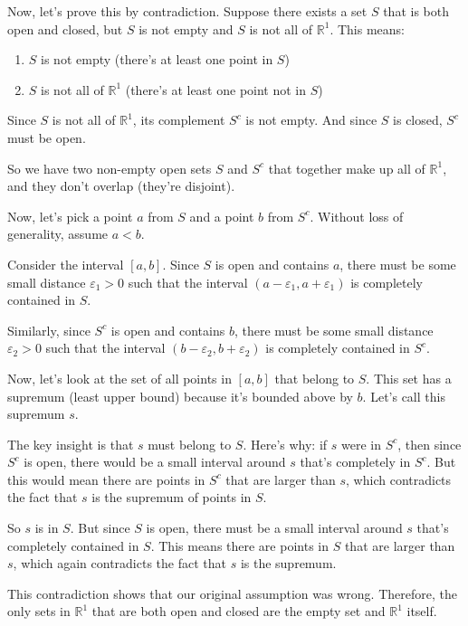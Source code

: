 Now, let's prove this by contradiction. Suppose there exists a set $S$ that is both open and closed, but $S$ is not empty and $S$ is not all of $\mathbb{R}^1$. This means:
\begin{enumerate}
\item $S$ is not empty (there's at least one point in $S$)
\item $S$ is not all of $\mathbb{R}^1$ (there's at least one point not in $S$)
\end{enumerate}

Since $S$ is not all of $\mathbb{R}^1$, its complement $S^c$ is not empty. And since $S$ is closed, $S^c$ must be open.

So we have two non-empty open sets $S$ and $S^c$ that together make up all of $\mathbb{R}^1$, and they don't overlap (they're disjoint).

Now, let's pick a point $a$ from $S$ and a point $b$ from $S^c$. Without loss of generality, assume $a < b$.

Consider the interval $[a, b]$. Since $S$ is open and contains $a$, there must be some small distance $\varepsilon_1 > 0$ such that the interval $(a - \varepsilon_1, a + \varepsilon_1)$ is completely contained in $S$.

Similarly, since $S^c$ is open and contains $b$, there must be some small distance $\varepsilon_2 > 0$ such that the interval $(b - \varepsilon_2, b + \varepsilon_2)$ is completely contained in $S^c$.

Now, let's look at the set of all points in $[a, b]$ that belong to $S$. This set has a supremum (least upper bound) because it's bounded above by $b$. Let's call this supremum $s$.

The key insight is that $s$ must belong to $S$. Here's why: if $s$ were in $S^c$, then since $S^c$ is open, there would be a small interval around $s$ that's completely in $S^c$. But this would mean there are points in $S^c$ that are larger than $s$, which contradicts the fact that $s$ is the supremum of points in $S$.

So $s$ is in $S$. But since $S$ is open, there must be a small interval around $s$ that's completely contained in $S$. This means there are points in $S$ that are larger than $s$, which again contradicts the fact that $s$ is the supremum.

This contradiction shows that our original assumption was wrong. Therefore, the only sets in $\mathbb{R}^1$ that are both open and closed are the empty set and $\mathbb{R}^1$ itself.

